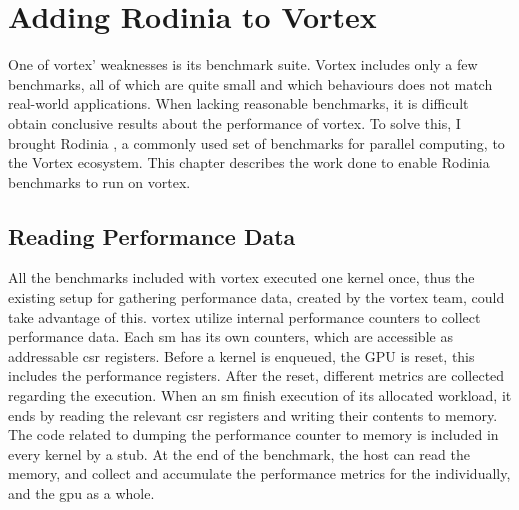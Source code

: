 \chapter{Adding Rodinia to Vortex}

One of \Gls{vortex}' weaknesses is its benchmark suite. Vortex includes only a few benchmarks, all of which are quite small and which behaviours does not match real-world applications. When lacking reasonable benchmarks, it is difficult obtain conclusive results about the performance of \Gls{vortex}. To solve this, I brought Rodinia \cite{rodinia}\cite{rodinia_characterization}, a commonly used set of benchmarks for parallel computing\cite{cactus}, to the Vortex ecosystem. This chapter describes the work done to enable Rodinia benchmarks to run on \Gls{vortex}. 


\section{Reading Performance Data} \label{sec:reading_perf}

All the benchmarks included with \Gls{vortex} executed one kernel once, thus the existing setup for gathering performance data, created by the \Gls{vortex} team, could take advantage of this. \Gls{vortex} utilize internal performance counters to collect performance data. Each \acrshort{sm} has its own counters, which are accessible as addressable \acrshort{csr} registers. Before a kernel is enqueued, the GPU is reset, this includes the performance registers. After the reset, different metrics are collected regarding the execution. When an \acrshort{sm} finish execution of its allocated workload, it ends by reading the relevant \acrshort{csr} registers and writing their contents to memory. The code related to dumping the performance counter to memory is included in every kernel by a stub. At the end of the benchmark, the host can read the memory, and collect and accumulate the performance metrics for the  individually, and the \acrshort{gpu} as a whole.

